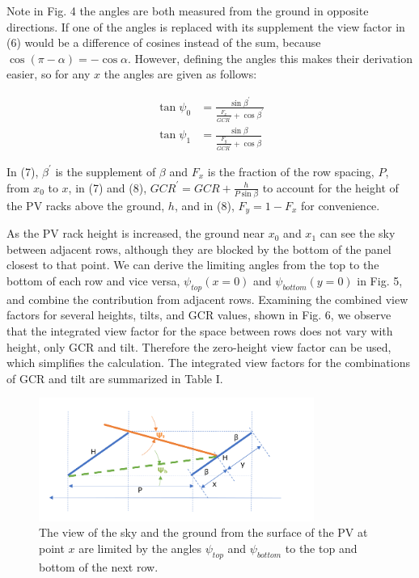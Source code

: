 \documentclass[conference]{IEEEtran}
\begin{document}
Note in Fig. 4 the angles are both measured from the ground in opposite directions.  If one of the angles is replaced with its supplement the view factor in (6) would be a difference of cosines instead of the sum, because $\cos \left(\pi - \alpha\right) = -\cos \alpha$.  However, defining the angles this makes their derivation easier, so for any $x$ the angles are given as follows:

\begin{align}
\tan \psi_0 &= \frac{\sin \beta^\prime}{\frac{F_x}{GCR^\prime} + \cos \beta^\prime}\\
\tan \psi_1 &= \frac{\sin \beta}{\frac{F_y}{GCR^\prime} + \cos \beta}
\end{align}

In (7), $\beta^\prime$ is the supplement of $\beta$ and $F_x$ is the fraction of the row spacing, $P$, from $x_0$ to $x$, in (7) and (8), $GCR^\prime=GCR+\frac{h}{P\sin\beta}$ to account for the height of the PV racks above the ground, $h$, and in (8), $F_y=1-F_x$ for convenience.

As the PV rack height is increased, the ground near $x_0$ and $x_1$ can see the sky between adjacent rows, although they are blocked by the bottom of the panel closest to that point.  We can derive the limiting angles from the top to the bottom of each row and vice versa, $\psi_{top}\left(x=0\right)$ and $\psi_{bottom}\left(y=0\right)$ in Fig. 5, and combine the contribution from adjacent rows.  Examining the combined view factors for several heights, tilts, and GCR values, shown in Fig. 6, we observe that the integrated view factor for the space between rows does not vary with height, only GCR and tilt.  Therefore the zero-height view factor can be used, which simplifies the calculation.  The integrated view factors for the combinations of GCR and tilt are summarized in Table I.

\begin{figure}
\centering
\includegraphics[width=9cm]{next-row-view-factor-angles.png}
\caption{The view of the sky and the ground from the surface of the PV at point $x$ are limited by the angles $\psi_{top}$ and $\psi_{bottom}$ to the top and bottom of the next row.}
\end{figure}
\end{document}
